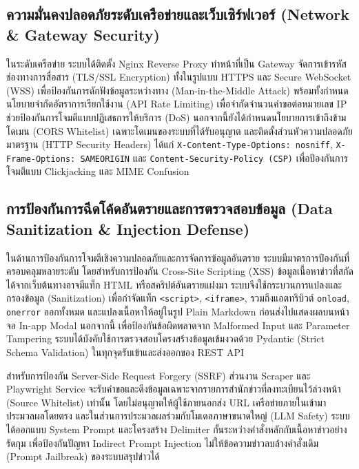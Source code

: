 \subsection{ความมั่นคงปลอดภัยระดับเครือข่ายและเว็บเซิร์ฟเวอร์ (Network \& Gateway Security)}

ในระดับเครือข่าย ระบบได้ติดตั้ง Nginx Reverse Proxy ทำหน้าที่เป็น Gateway จัดการเข้ารหัสช่องทางการสื่อสาร (TLS/SSL Encryption) ทั้งในรูปแบบ HTTPS และ Secure WebSocket (WSS) เพื่อป้องกันการดักฟังข้อมูลระหว่างทาง (Man-in-the-Middle Attack) พร้อมทั้งกำหนดนโยบายจำกัดอัตราการเรียกใช้งาน (API Rate Limiting) เพื่อจำกัดจำนวนคำขอต่อหมายเลข IP ช่วยป้องกันการโจมตีแบบปฏิเสธการให้บริการ (DoS) นอกจากนี้ยังได้กำหนดนโยบายการเข้าถึงข้ามโดเมน (CORS Whitelist) เฉพาะโดเมนของระบบที่ได้รับอนุญาต และติดตั้งส่วนหัวความปลอดภัยมาตรฐาน (HTTP Security Headers) ได้แก่ \texttt{X-Content-Type-Options: nosniff}, \texttt{X-Frame-Options: SAMEORIGIN} และ \texttt{Content-Security-Policy (CSP)} เพื่อป้องกันการโจมตีแบบ Clickjacking และ MIME Confusion

\subsection{การป้องกันการฉีดโค้ดอันตรายและการตรวจสอบข้อมูล (Data Sanitization \& Injection Defense)}

ในด้านการป้องกันการโจมตีเชิงความปลอดภัยและการจัดการข้อมูลอันตราย ระบบมีมาตรการป้องกันที่ครอบคลุมหลายระดับ โดยสำหรับการป้องกัน Cross-Site Scripting (XSS) ข้อมูลเนื้อหาข่าวที่สกัดได้จากเว็บต้นทางอาจมีแท็ก HTML หรือสคริปต์อันตรายแฝงมา ระบบจึงใช้กระบวนการแปลงและกรองข้อมูล (Sanitization) เพื่อกำจัดแท็ก \texttt{<script>}, \texttt{<iframe>}, รวมถึงแอตทริบิวต์ \texttt{onload}, \texttt{onerror} ออกทั้งหมด และแปลงเนื้อหาให้อยู่ในรูป Plain Markdown ก่อนส่งไปแสดงผลบนหน้าจอ In-app Modal นอกจากนี้ เพื่อป้องกันข้อผิดพลาดจาก Malformed Input และ Parameter Tampering ระบบได้บังคับใช้การตรวจสอบโครงสร้างข้อมูลเข้มงวดด้วย Pydantic (Strict Schema Validation) ในทุกจุดรับเข้าและส่งออกของ REST API

สำหรับการป้องกัน Server-Side Request Forgery (SSRF) ส่วนงาน Scraper และ Playwright Service จะรับคำขอและดึงข้อมูลเฉพาะจากรายการสำนักข่าวที่ลงทะเบียนไว้ล่วงหน้า (Source Whitelist) เท่านั้น โดยไม่อนุญาตให้ผู้ใช้ภายนอกส่ง URL เครือข่ายภายในเข้ามาประมวลผลโดยตรง และในส่วนการประมวลผลร่วมกับโมเดลภาษาขนาดใหญ่ (LLM Safety) ระบบได้ออกแบบ System Prompt และโครงสร้าง Delimiter กั้นระหว่างคำสั่งหลักกับเนื้อหาข่าวอย่างรัดกุม เพื่อป้องกันปัญหา Indirect Prompt Injection ไม่ให้ข้อความข่าวลบล้างคำสั่งเดิม (Prompt Jailbreak) ของระบบสรุปข่าวได้

